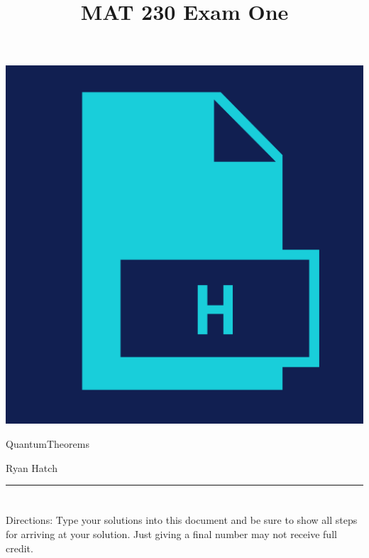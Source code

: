 \documentclass{amsart}
\theoremstyle{definition}
\theoremstyle{Exercise}
\theoremstyle{remark}
\theoremstyle{rule}
\numberwithin{equation}{section}
\begin{document}
\title{\sf MAT 230 Exam One}%


\begin{center}
\includegraphics[scale=.1]{logo.png}
\end{center}

\maketitle
QuantumTheorems
\begin{center}
Ryan Hatch
\end{center}

\begin{center}
\rule{\textwidth}{0.4pt}
\end{center}
\newpage
\section*{}
\section*{}
Directions: Type your solutions into this document and be sure to show all steps for arriving at your solution. Just giving a final number may not receive full credit.
\\
\end{document}
